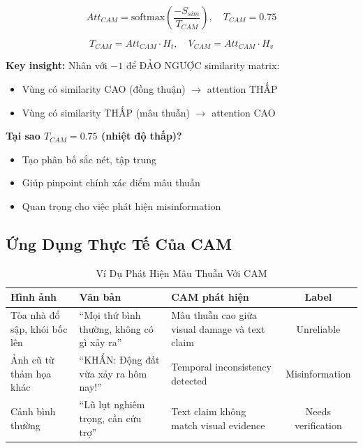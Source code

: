 \documentclass[12pt,a4paper]{article}
\begin{document}
\begin{equation}
Att_{CAM} = \text{softmax}\left(\frac{-S_{sim}}{T_{CAM}}\right), \quad T_{CAM} = 0.75
\label{eq:cam}
\end{equation}

\begin{equation}
T_{CAM} = Att_{CAM} \cdot H_t, \quad V_{CAM} = Att_{CAM} \cdot H_v
\end{equation}

\textbf{Key insight:} Nhân với $-1$ để ĐẢO NGƯỢC similarity matrix:
\begin{itemize}
    \item Vùng có similarity CAO (đồng thuận) $\rightarrow$ attention THẤP
    \item Vùng có similarity THẤP (mâu thuẫn) $\rightarrow$ attention CAO
\end{itemize}

\textbf{Tại sao $T_{CAM} = 0.75$ (nhiệt độ thấp)?}
\begin{itemize}
    \item Tạo phân bố sắc nét, tập trung
    \item Giúp pinpoint chính xác điểm mâu thuẫn
    \item Quan trọng cho việc phát hiện misinformation
\end{itemize}

\subsection{Ứng Dụng Thực Tế Của CAM}

\begin{table}[H]
\centering
\caption{Ví Dụ Phát Hiện Mâu Thuẫn Với CAM}
\label{tab:cam_examples}
\small
\begin{tabular}{p{3cm}|p{4cm}|p{4cm}|c}
\toprule
\textbf{Hình ảnh} & \textbf{Văn bản} & \textbf{CAM phát hiện} & \textbf{Label} \\
\midrule
Tòa nhà đổ sập, khói bốc lên & ``Mọi thứ bình thường, không có gì xảy ra'' & Mâu thuẫn cao giữa visual damage và text claim & Unreliable \\
\midrule
Ảnh cũ từ thảm họa khác & ``KHẨN: Động đất vừa xảy ra hôm nay!'' & Temporal inconsistency detected & Misinformation \\
\midrule
Cảnh bình thường & ``Lũ lụt nghiêm trọng, cần cứu trợ'' & Text claim không match visual evidence & Needs verification \\
\bottomrule
\end{tabular}
\end{table}
\end{document}
